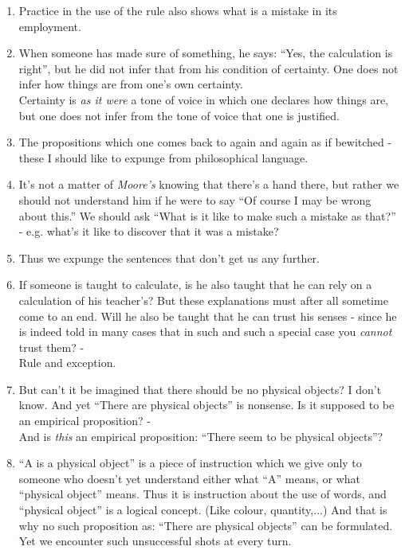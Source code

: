 \documentclass{book}
\begin{document}
\begin{enumerate}
\item
Practice in the use of the rule also shows what is a mistake in its employment.

\item
When someone has made sure of something, he says: ``Yes, the calculation is
right'', but he did not infer that from his condition of certainty. One does
not infer how things are from one's own certainty. \\
Certainty is \emph{as it were} a tone of voice in which one declares how things
are, but one does not infer from the tone of voice that one is justified.

\item
The propositions which one comes back to again and again as if bewitched -
these I should like to expunge from philosophical language.

\item
It's not a matter of \emph{Moore's} knowing that there's a hand there, but
rather we should not understand him if he were to say ``Of course I may be
wrong about this.'' We should ask ``What is it like to make such a mistake as
that?'' - e.g. what's it like to discover that it was a mistake?

\item
Thus we expunge the sentences that don't get us any further.

\item
If someone is taught to calculate, is he also taught that he can rely on a
calculation of his teacher's? But these explanations must after all sometime
come to an end. Will he also be taught that he can trust his senses - since he
is indeed told in many cases that in such and such a special case you
\emph{cannot} trust them? - \\
Rule and exception.

\item
But can't it be imagined that there should be no physical objects? I don't
know. And yet ``There are physical objects'' is nonsense. Is it supposed to be
an empirical proposition? - \\ 
And is \emph{this} an empirical proposition: ``There seem to be physical
objects''?

\item
``A is a physical object'' is a piece of instruction which we give only to
someone who doesn't yet understand either what ``A'' means, or what ``physical
object'' means. Thus it is instruction about the use of words, and ``physical
object'' is a logical concept. (Like colour, quantity,...) And that is why no
such proposition as: ``There are physical objects'' can be formulated.  Yet we
encounter such unsuccessful shots at every turn.


\end{enumerate}
\end{document}
